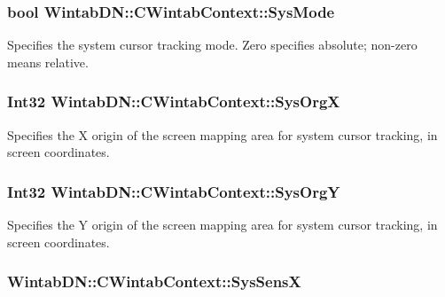 \hypertarget{class_wintab_d_n_1_1_c_wintab_context_a7db3d4d62f8480bf6a3ed14eadd2d818}{
\subsubsection[{SysMode}]{\setlength{\rightskip}{0pt plus 5cm}bool WintabDN::CWintabContext::SysMode}}
\label{class_wintab_d_n_1_1_c_wintab_context_a7db3d4d62f8480bf6a3ed14eadd2d818}


Specifies the system cursor tracking mode. Zero specifies absolute; non-\/zero means relative. 

\hypertarget{class_wintab_d_n_1_1_c_wintab_context_a16fbcf8a36f27eff242c53ecb94a70b7}{
\subsubsection[{SysOrgX}]{\setlength{\rightskip}{0pt plus 5cm}Int32 WintabDN::CWintabContext::SysOrgX}}
\label{class_wintab_d_n_1_1_c_wintab_context_a16fbcf8a36f27eff242c53ecb94a70b7}


Specifies the X origin of the screen mapping area for system cursor tracking, in screen coordinates. 

\hypertarget{class_wintab_d_n_1_1_c_wintab_context_a165bbb382ea203f3cfde4e07ea9d9f5c}{
\subsubsection[{SysOrgY}]{\setlength{\rightskip}{0pt plus 5cm}Int32 WintabDN::CWintabContext::SysOrgY}}
\label{class_wintab_d_n_1_1_c_wintab_context_a165bbb382ea203f3cfde4e07ea9d9f5c}


Specifies the Y origin of the screen mapping area for system cursor tracking, in screen coordinates. 

\hypertarget{class_wintab_d_n_1_1_c_wintab_context_a86103ce6d5340f20399bebf09b542a76}{
\subsubsection[{SysSensX}]{ WintabDN::CWintabContext::SysSensX}}
\label{class_wintab_d_n_1_1_c_wintab_context_a86103ce6d5340f20399bebf09b542a76}


